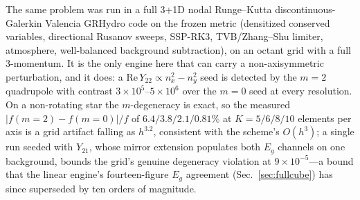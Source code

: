 \documentclass[aps,prd,reprint,amsmath,amssymb,nofootinbib,longbibliography,superscriptaddress]{revtex4-2}
\begin{document}
The same problem was run in a full 3+1D nodal Runge--Kutta discontinuous-Galerkin Valencia
GRHydro code on the frozen metric (densitized conserved variables, directional Rusanov sweeps,
SSP-RK3, TVB/Zhang--Shu limiter, atmosphere, well-balanced background subtraction), on an octant
grid with a full 3-momentum. It is the only engine here that can carry a non-axisymmetric
perturbation, and it does: a $\mathrm{Re}\,Y_{22}\propto n_x^2-n_y^2$ seed is detected by the
$m=2$ quadrupole with contrast $3\times10^5$--$5\times10^6$ over the $m=0$ seed at every
resolution. On a non-rotating star the $m$-degeneracy is exact, so the measured
$|f(m{=}2)-f(m{=}0)|/f$ of $6.4/3.8/2.1/0.81\%$ at $K = 5/6/8/10$ elements per axis is a grid
artifact falling as $h^{3.2}$, consistent with the scheme's $O(h^3)$; a single run seeded with
$Y_{21}$, whose mirror extension populates both $E_g$ channels on one background, bounds the
grid's genuine degeneracy violation at $9\times10^{-5}$---a bound that the linear engine's
fourteen-figure $E_g$ agreement (Sec.~\ref{sec:fullcube}) has since superseded by ten orders of
magnitude.
\end{document}
